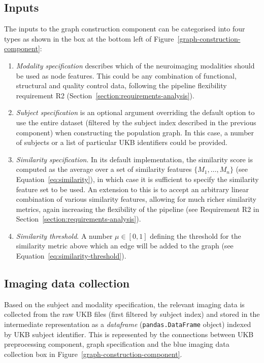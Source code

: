 \subsection{Inputs}
The inputs to the graph construction component can be categorised into four types as shown in the box at the bottom left of Figure~\ref{graph-construction-component}:
\begin{enumerate}
    \item \textit{Modality specification} describes which of the neuroimaging modalities should be used as node features. This could be any combination of functional, structural and quality control data, following the pipeline flexibility requirement R2 (Section~\ref{section:requirements-analysis}).
    \item \textit{Subject specification} is an optional argument overriding the default option to use the entire dataset (filtered by the subject index described in the previous component) when constructing the population graph. In this case, a number of subjects or a list of particular UKB identifiers could be provided.
    \item \textit{Similarity specification}. 
    In its default implementation, the similarity score is computed as the average over a set of similarity features $\{M_1, \dots, M_n\}$ (see Equation~\eqref{eq:similarity}), in which case it is sufficient to specify the similarity feature set to be used. An extension to this is to accept an arbitrary linear combination of various similarity features, allowing for much richer similarity metrics, again increasing the flexibility of the pipeline (see Requirement R2 in Section~\ref{section:requirements-analysis}). 
    \item \textit{Similarity threshold}. A number $\mu \in [0,1]$ defining the threshold for the similarity metric above which an edge will be added to the graph (see Equation~\eqref{eq:similarity-threshold}).
\end{enumerate}


\subsection{Imaging data collection}

Based on the subject and modality specification, the relevant imaging data is collected from the raw UKB files (first filtered by subject index) and stored in the intermediate representation as a \textit{dataframe} (\texttt{pandas.DataFrame} object) indexed by UKB subject identifier. This is represented by the connections between UKB preprocessing component, graph specification and the blue imaging data collection box in Figure~\ref{graph-construction-component}. 

